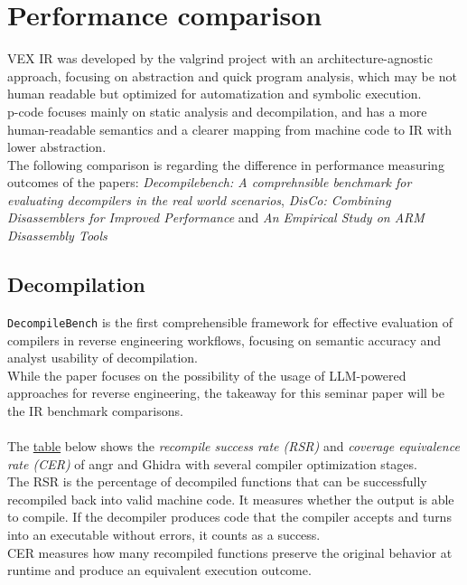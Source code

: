 \documentclass[seminar]{plai}
\begin{document}
\section{Performance comparison}
\label{sec:performance comparison}
VEX IR was developed by the valgrind project with an architecture-agnostic approach, focusing on abstraction and quick program analysis, which may be not human readable but optimized for automatization and symbolic execution.\\
p-code focuses mainly on static analysis and decompilation, and has a more human-readable semantics and a clearer mapping from machine code to IR with lower abstraction.\\
The following comparison is regarding the difference in performance measuring outcomes of the papers:\textit{ Decompilebench: A comprehnsible benchmark for evaluating decompilers in the real world scenarios}\cite{decompileBench-comprehensice-benchmark-for-evaluating-decompilers-in-real-world-scenarios}, \textit{DisCo: Combining Disassemblers for Improved Performance}\cite{DisCo-combining-disassemblers-for-improved-performance} and \textit{An Empirical Study on ARM Disassembly Tools}\cite{an-empirical-study-on-ARM-disassembly-disassembly-tools}

\subsection{Decompilation}
\texttt{DecompileBench} is the first comprehensible framework for effective evaluation of compilers in reverse engineering workflows, focusing on semantic accuracy and analyst usability of decompilation.\\
While the paper focuses on the possibility of the usage of LLM-powered approaches for reverse engineering, the takeaway for this seminar paper will be the IR benchmark comparisons.\\
\\
The \hyperref[sec:decompileBench-comparison]{table} below shows the \textit{recompile success rate (RSR)} and \textit{coverage equivalence rate (CER)} of angr and Ghidra with several compiler optimization stages.\\
The RSR is the percentage of decompiled functions that can be successfully recompiled back into valid machine code. It measures whether the output is able to compile. If the decompiler produces code that the compiler accepts and turns into an executable without errors, it counts as a success.\\
CER measures how many recompiled functions preserve the original behavior at runtime and produce an equivalent execution outcome.
\end{document}
